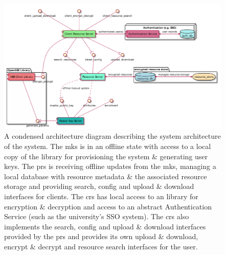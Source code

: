\begin{figure}
    \centering
    \includegraphics[width=\linewidth,keepaspectratio]{images/infrastructure/system_architecture_abbrv.pdf}

    \caption{
      \label{fig:sys_arch_abbrv}
      A condensed architecture diagram describing the system architecture of the \theResServer system. The \acrfull{mks} is in an offline state with access to a local copy of the \OpenABE library for provisioning the system \& generating user keys. The \acrfull{prs} is receiving offline updates from the \acrshort{mks}, managing a local database with resource metadata \& the associated resource storage and providing search, config and upload \& download interfaces for clients. The \acrfull{crs} has local access to an \OpenABE library for encryption \& decryption and access to an abstract Authentication Service (such as the university's SSO system). The \acrshort{crs} also implements the search, config and upload \& download interfaces provided by the \acrshort{prs} and provides its own upload \& download, encrypt \& decrypt and resource search interfaces for the user.
    }

\end{figure}
